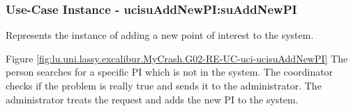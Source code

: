 
	\subsubsection{Use-Case Instance - ucisuAddNewPI:suAddNewPI}
	
	Represents the instance of adding a new point 
	of interest to the system.		  
	\begin{operationmodel}
	
	\end{operationmodel} 

	
	Figure \ref{fig:lu.uni.lassy.excalibur.MyCrash.G02-RE-UC-uci-ucisuAddNewPI}
	The person searches for a specific PI which is not in the system. 
	The coordinator checks if the problem is really true and sends it to the administrator. 
	The administrator treats the request and adds the new PI to the system.
	
